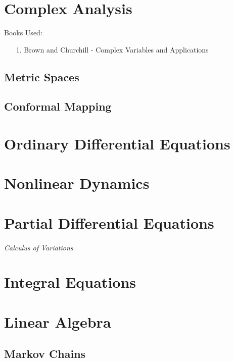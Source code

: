 \documentclass[12pt, english]{book}
\theoremstyle{break}
\theoremstyle{plain}
\begin{document}
	\part{Complex Analysis}
	Books Used: 
	\begin{itemize}
		\item[1.] Brown and Churchill - Complex Variables and Applications \cite{Brown.J;Churchill.R-Complex-Variables-2014}
	\end{itemize}


	\chapter{Metric Spaces}	
	
	\chapter{Conformal Mapping}
	
	
	\part{Ordinary Differential Equations}
	
	\part{Nonlinear Dynamics}
	
	
	\part{Partial Differential Equations}
	
	\paragraph{Calculus of Variations}
	
	\part{Integral Equations}
	
	
	\part{Linear Algebra}
	
	\chapter{Markov Chains}
	
\end{document}
